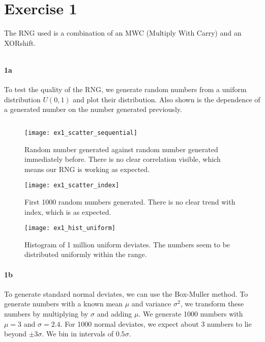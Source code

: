 \section*{Exercise 1}
The RNG used is a combination of an MWC (Multiply With Carry) and an XORshift.

\inputminted[firstline=156, lastline=193]{Python}{../NUR_random.py}

\paragraph{1a}
To test the quality of the RNG, we generate random numbers from a uniform distribution $U(0, 1)$ and plot their distribution.
Also shown is the dependence of a generated number on the number generated previously.

\inputminted[firstline=7, lastline=34]{Python}{../ex1.py}

\begin{figure}[h]
  \centering
  \texttt{[image: ex1\_scatter\_sequential]}
  \caption{Random number generated against random number generated immediately before.
  There is no clear correlation visible, which means our RNG is working as expected.}\label{fig:ex1_scatter_sequential}
\end{figure}
\begin{figure}[h]
  \centering
  \texttt{[image: ex1\_scatter\_index]}
  \caption{First 1000 random numbers generated.
  There is no clear trend with index, which is as expected.}\label{fig:ex1_scatter_index}
\end{figure}
\begin{figure}[h]
  \centering
  \texttt{[image: ex1\_hist\_uniform]}
  \caption{Histogram of 1 million uniform deviates.
  The numbers seem to be distributed uniformly within the range.}\label{fig:ex1_hist_uniform}
\end{figure}

\clearpage

\paragraph{1b}
To generate standard normal deviates, we can use the Box-Muller method.
To generate numbers with a known mean $\mu$ and variance $\sigma^2$, we transform these numbers by multiplying by $\sigma$ and adding $\mu$.
We generate 1000 numbers with $\mu = 3$ and $\sigma = 2.4$.
For 1000 normal deviates, we expect about 3 numbers to lie beyond $\pm 3 \sigma$.
We bin in intervals of $0.5 \sigma$.

